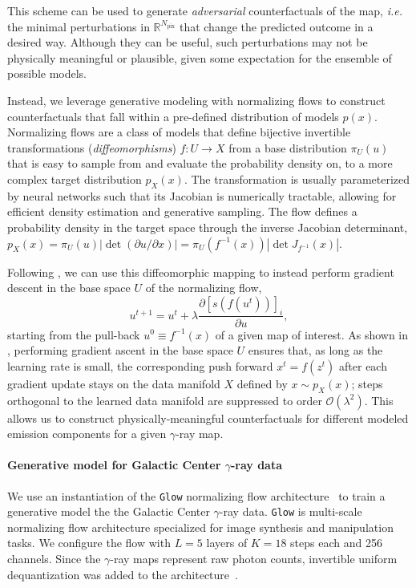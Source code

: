 \documentclass[nohyperref]{article}
\theoremstyle{plain}
\theoremstyle{definition}
\theoremstyle{remark}
\begin{document}
This scheme can be used to generate \emph{adversarial} counterfactuals of the map, \emph{i.e.} the minimal perturbations in $\mathbb R^{N_\mathrm{pix}}$ that change the predicted outcome in a desired way. Although they can be useful, such perturbations may not be physically meaningful or plausible, given some expectation for the ensemble of possible models. 

Instead, we leverage generative modeling with normalizing flows to construct counterfactuals that fall within a pre-defined distribution of models $p(x)$. Normalizing flows are a class of models that define bijective invertible transformations (\emph{diffeomorphisms}) $f: U\rightarrow X$ from a base distribution $\pi_{U}(u)$ that is easy to sample from and evaluate the probability density on, to a more complex target distribution $p_{X}(x)$. The transformation is usually parameterized by neural networks such that its Jacobian is numerically tractable, allowing for efficient density estimation and generative sampling. The flow defines a probability density in the target space through the inverse Jacobian determinant, ${p}_X(x)=\pi_U(u)\left|\operatorname{det}\left({\partial u}/{\partial x}\right)\right|=\pi_U\left(f^{-1}(x)\right)\left|\operatorname{det} J_{f^{-1}}(x)\right|$.

Following \citet{dombrowski2021diffeomorphic}, we can use this diffeomorphic mapping to instead perform gradient descent in the base space $U$ of the normalizing flow,
\begin{equation}
    \label{eq:flow_gradient}
    u^{t+1}=u^{t}+\lambda \frac{\partial\left[s\left(f(u^{t})\right)\right]_{i}}{\partial u},
\end{equation}
starting from the pull-back $u^{0} \equiv f^{-1}(x)$ of a given map of interest. As shown in \citet{dombrowski2021diffeomorphic}, performing gradient ascent in the base space $U$ ensures that, as long as the learning rate is small, the corresponding push forward $x^t=f(z^t)$ after each gradient update stays on the data manifold $X$ defined by $x\sim p_X(x)$; steps orthogonal to the learned data manifold are suppressed to order $\mathcal O(\lambda^2)$. This allows us to construct physically-meaningful counterfactuals for different modeled emission components for a given $\gamma$-ray map.

\paragraph*{Generative model for Galactic Center $\gamma$-ray data}
We use an instantiation of the \texttt{Glow} normalizing flow architecture~\cite{DBLP:conf/nips/KingmaD18} to train a generative model the the Galactic Center $\gamma$-ray data. \texttt{Glow} is multi-scale normalizing flow architecture specialized for image synthesis and manipulation tasks. We configure the flow with $L=5$ layers of $K=18$ steps each and 256 channels. Since the $\gamma$-ray maps represent raw photon counts, invertible uniform dequantization was added to the architecture~\cite{DBLP:conf/icml/HoCSDA19}.
\end{document}
